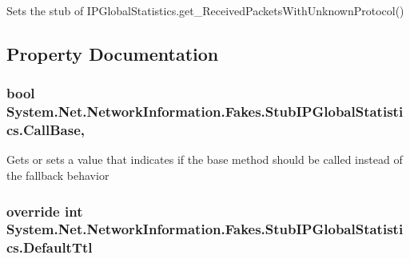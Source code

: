 Sets the stub of I\-P\-Global\-Statistics.\-get\-\_\-\-Received\-Packets\-With\-Unknown\-Protocol()



\subsection{Property Documentation}
\hypertarget{class_system_1_1_net_1_1_network_information_1_1_fakes_1_1_stub_i_p_global_statistics_ad664a826b8e457bdd702e6856add0b43}{
\subsubsection[{Call\-Base}]{\setlength{\rightskip}{0pt plus 5cm}bool System.\-Net.\-Network\-Information.\-Fakes.\-Stub\-I\-P\-Global\-Statistics.\-Call\-Base\hspace{0.3cm}{\ttfamily [get]}, {\ttfamily [set]}}}\label{class_system_1_1_net_1_1_network_information_1_1_fakes_1_1_stub_i_p_global_statistics_ad664a826b8e457bdd702e6856add0b43}


Gets or sets a value that indicates if the base method should be called instead of the fallback behavior

\hypertarget{class_system_1_1_net_1_1_network_information_1_1_fakes_1_1_stub_i_p_global_statistics_a2cc1692a90f3816767e34f6c8d7e133b}{
\subsubsection[{Default\-Ttl}]{\setlength{\rightskip}{0pt plus 5cm}override int System.\-Net.\-Network\-Information.\-Fakes.\-Stub\-I\-P\-Global\-Statistics.\-Default\-Ttl\hspace{0.3cm}{\ttfamily [get]}}}\label{class_system_1_1_net_1_1_network_information_1_1_fakes_1_1_stub_i_p_global_statistics_a2cc1692a90f3816767e34f6c8d7e133b}


